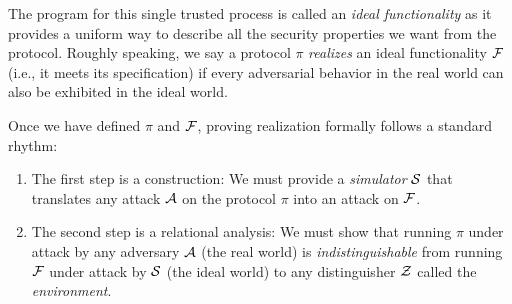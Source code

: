 The program for this single trusted process is called an \emph{ideal
  functionality} as it provides a uniform way to describe all the security
properties we want from the protocol. Roughly speaking, we say a protocol
$\pi$ \emph{realizes} an ideal functionality $\mathcal{{F}}$ (i.e., it meets its
specification) if every adversarial behavior in the real world can also be
exhibited in the ideal world.

Once we have defined $\pi$ and $\mathcal{{F}}$, proving realization formally
follows a standard rhythm:
\begin{enumerate}[leftmargin=*]
\item The first step is a construction: We must provide a \emph{simulator}
  $\mathcal{{S}}$ that translates any attack $\mathcal{{A}}$ on the protocol $\pi$ into
  an attack on $\mathcal{{F}}$.
\item The second step is a relational analysis: We must show that running $\pi$
  under attack by any adversary $\mathcal{{A}}$ (the real world) is
  \emph{indistinguishable} from running $\mathcal{{F}}$ under attack by $\mathcal{{S}}$ (the
  ideal world) to any distinguisher $\mathcal{{Z}}$ called the \emph{environment}.
\end{enumerate}

